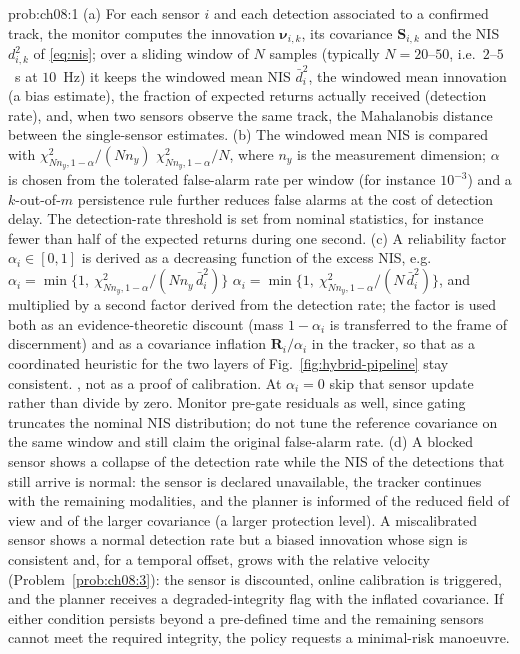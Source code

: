 \documentclass[graybox,envcountchap]{style/SNmono}
\providecommand{\DIFadd}[1]{{\protect\color{blue} #1}} %
\providecommand{\DIFdel}[1]{{\protect\color{red} #1}} %
\providecommand{\DIFaddbegin}{} %
\providecommand{\DIFaddend}{} %
\providecommand{\DIFdelbegin}{} %
\providecommand{\DIFdelend}{} %
\begin{document}
\begin{sol}{prob:ch08:1}
(a) For each sensor $i$ and each detection associated to a confirmed track, the monitor computes the innovation $\boldsymbol{\nu}_{i,k}$, its covariance $\mathbf{S}_{i,k}$ and the NIS $d^2_{i,k}$ of \eqref{eq:nis}; over a sliding window of $N$ samples (typically $N=20$--$50$, i.e.\ $2$--$5$~s at $10$~Hz) it keeps the windowed mean NIS $\bar d^2_i$, the windowed mean innovation (a bias estimate), the fraction of expected returns actually received (detection rate), and, when two sensors observe the same track, the Mahalanobis distance between the single-sensor estimates. (b) The windowed mean NIS is compared with \DIFdelbegin \DIFdel{$\chi^2_{Nn_y,1-\alpha}/(Nn_y)$}\DIFdelend \DIFaddbegin \DIFadd{$\chi^2_{Nn_y,1-\alpha}/N$}\DIFaddend , where $n_y$ is the measurement dimension; $\alpha$ is chosen from the tolerated false-alarm rate per window (for instance $10^{-3}$) and a $k$-out-of-$m$ persistence rule further reduces false alarms at the cost of detection delay. The detection-rate threshold is set from nominal statistics, for instance fewer than half of the expected returns during one second. (c) A reliability factor $\alpha_i\in[0,1]$ is derived as a decreasing function of the excess NIS, e.g.\ \DIFdelbegin \DIFdel{$\alpha_i=\min\{1,\ \chi^2_{Nn_y,1-\alpha}/(Nn_y\,\bar d^2_i)\}$}\DIFdelend \DIFaddbegin \DIFadd{$\alpha_i=\min\{1,\ \chi^2_{Nn_y,1-\alpha}/(N\,\bar d^2_i)\}$}\DIFaddend , and multiplied by a second factor derived from the detection rate; the factor is used both as an evidence-theoretic discount (mass $1-\alpha_i$ is transferred to the frame of discernment) and as a covariance inflation $\mathbf{R}_i/\alpha_i$ in the tracker, \DIFdelbegin \DIFdel{so that }\DIFdelend \DIFaddbegin \DIFadd{as a coordinated heuristic for }\DIFaddend the two layers of Fig.~\ref{fig:hybrid-pipeline}\DIFdelbegin \DIFdel{stay consistent. }\DIFdelend \DIFaddbegin \DIFadd{, not as a proof of calibration. At $\alpha_i=0$ skip that sensor update rather than divide by zero. Monitor pre-gate residuals as well, since gating truncates the nominal NIS distribution; do not tune the reference covariance on the same window and still claim the original false-alarm rate. }\DIFaddend (d) A blocked sensor shows a collapse of the detection rate while the NIS of the detections that still arrive is normal: the sensor is declared unavailable, the tracker continues with the remaining modalities, and the planner is informed of the reduced field of view and of the larger covariance (a larger protection level). A miscalibrated sensor shows a normal detection rate but a biased innovation whose sign is consistent and, for a temporal offset, grows with the relative velocity (Problem~\ref{prob:ch08:3}): the sensor is discounted, online calibration is triggered, and the planner receives a degraded-integrity flag with the inflated covariance. If either condition persists beyond a pre-defined time and the remaining sensors cannot meet the required integrity, the policy requests a minimal-risk manoeuvre.
\end{sol}
\end{document}
